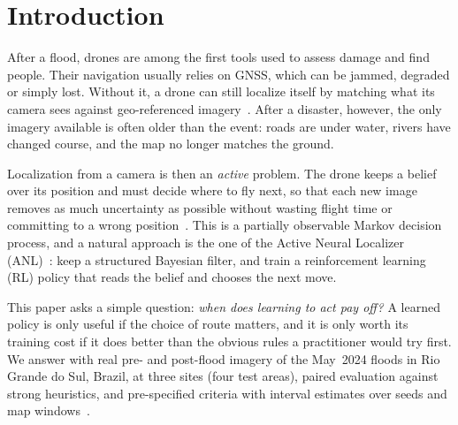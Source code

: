 \section{Introduction}
\label{sec:intro}

After a flood, drones are among the first tools used to assess damage and find people. Their navigation usually relies on GNSS, which can be jammed, degraded or simply lost. Without it, a drone can still localize itself by matching what its camera sees against geo-referenced imagery~\cite{couturier2021review,couturier2024review}. After a disaster, however, the only imagery available is often older than the event: roads are under water, rivers have changed course, and the map no longer matches the ground.

Localization from a camera is then an \emph{active} problem. The drone keeps a belief over its position and must decide where to fly next, so that each new image removes as much uncertainty as possible without wasting flight time or committing to a wrong position~\cite{burgard1997active}. This is a partially observable Markov decision process, and a natural approach is the one of the Active Neural Localizer (ANL)~\cite{chaplot2018anl}: keep a structured Bayesian filter, and train a reinforcement learning (RL) policy that reads the belief and chooses the next move.

This paper asks a simple question: \emph{when does learning to act pay off?} A learned policy is only useful if the choice of route matters, and it is only worth its training cost if it does better than the obvious rules a practitioner would try first. We answer with real pre- and post-flood imagery of the May~2024 floods in Rio Grande do Sul, Brazil, at three sites (four test areas), paired evaluation against strong heuristics, and pre-specified criteria with interval estimates over seeds and map windows~\cite{agarwal2021rliable}.

